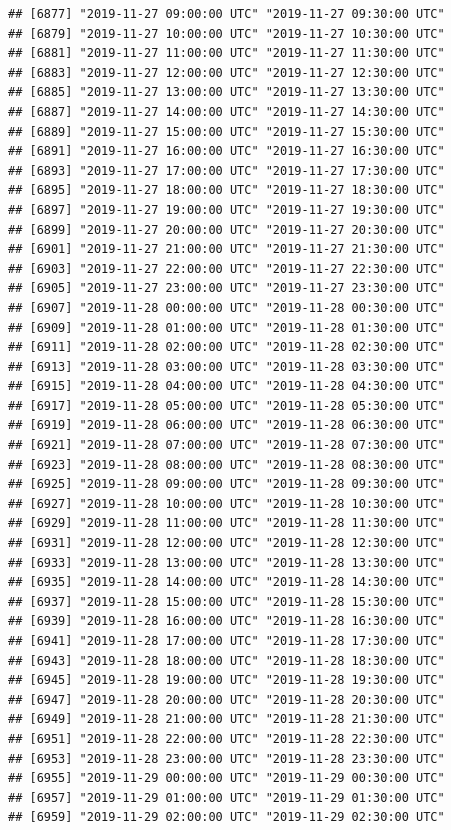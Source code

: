 \documentclass{article}\usepackage[]{graphicx}\usepackage[]{color}
\makeatletter
\newenvironment{kframe}{%
 \def\at@end@of@kframe{}%
 \ifinner\ifhmode%
  \def\at@end@of@kframe{\end{minipage}}%
  \begin{minipage}{\columnwidth}%
 \fi\fi%
 \def\FrameCommand##1{\hskip\@totalleftmargin \hskip-\fboxsep
 \colorbox{shadecolor}{##1}\hskip-\fboxsep
     \hskip-\linewidth \hskip-\@totalleftmargin \hskip\columnwidth}%
 \MakeFramed {\advance\hsize-\width
   \@totalleftmargin\z@ \linewidth\hsize
   \@setminipage}}%
 {\par\unskip\endMakeFramed%
 \at@end@of@kframe}
\newenvironment{knitrout}{}{} %
\makeatother
\begin{document}
\begin{knitrout}
\begin{kframe}
\begin{verbatim}
## [6877] "2019-11-27 09:00:00 UTC" "2019-11-27 09:30:00 UTC"
## [6879] "2019-11-27 10:00:00 UTC" "2019-11-27 10:30:00 UTC"
## [6881] "2019-11-27 11:00:00 UTC" "2019-11-27 11:30:00 UTC"
## [6883] "2019-11-27 12:00:00 UTC" "2019-11-27 12:30:00 UTC"
## [6885] "2019-11-27 13:00:00 UTC" "2019-11-27 13:30:00 UTC"
## [6887] "2019-11-27 14:00:00 UTC" "2019-11-27 14:30:00 UTC"
## [6889] "2019-11-27 15:00:00 UTC" "2019-11-27 15:30:00 UTC"
## [6891] "2019-11-27 16:00:00 UTC" "2019-11-27 16:30:00 UTC"
## [6893] "2019-11-27 17:00:00 UTC" "2019-11-27 17:30:00 UTC"
## [6895] "2019-11-27 18:00:00 UTC" "2019-11-27 18:30:00 UTC"
## [6897] "2019-11-27 19:00:00 UTC" "2019-11-27 19:30:00 UTC"
## [6899] "2019-11-27 20:00:00 UTC" "2019-11-27 20:30:00 UTC"
## [6901] "2019-11-27 21:00:00 UTC" "2019-11-27 21:30:00 UTC"
## [6903] "2019-11-27 22:00:00 UTC" "2019-11-27 22:30:00 UTC"
## [6905] "2019-11-27 23:00:00 UTC" "2019-11-27 23:30:00 UTC"
## [6907] "2019-11-28 00:00:00 UTC" "2019-11-28 00:30:00 UTC"
## [6909] "2019-11-28 01:00:00 UTC" "2019-11-28 01:30:00 UTC"
## [6911] "2019-11-28 02:00:00 UTC" "2019-11-28 02:30:00 UTC"
## [6913] "2019-11-28 03:00:00 UTC" "2019-11-28 03:30:00 UTC"
## [6915] "2019-11-28 04:00:00 UTC" "2019-11-28 04:30:00 UTC"
## [6917] "2019-11-28 05:00:00 UTC" "2019-11-28 05:30:00 UTC"
## [6919] "2019-11-28 06:00:00 UTC" "2019-11-28 06:30:00 UTC"
## [6921] "2019-11-28 07:00:00 UTC" "2019-11-28 07:30:00 UTC"
## [6923] "2019-11-28 08:00:00 UTC" "2019-11-28 08:30:00 UTC"
## [6925] "2019-11-28 09:00:00 UTC" "2019-11-28 09:30:00 UTC"
## [6927] "2019-11-28 10:00:00 UTC" "2019-11-28 10:30:00 UTC"
## [6929] "2019-11-28 11:00:00 UTC" "2019-11-28 11:30:00 UTC"
## [6931] "2019-11-28 12:00:00 UTC" "2019-11-28 12:30:00 UTC"
## [6933] "2019-11-28 13:00:00 UTC" "2019-11-28 13:30:00 UTC"
## [6935] "2019-11-28 14:00:00 UTC" "2019-11-28 14:30:00 UTC"
## [6937] "2019-11-28 15:00:00 UTC" "2019-11-28 15:30:00 UTC"
## [6939] "2019-11-28 16:00:00 UTC" "2019-11-28 16:30:00 UTC"
## [6941] "2019-11-28 17:00:00 UTC" "2019-11-28 17:30:00 UTC"
## [6943] "2019-11-28 18:00:00 UTC" "2019-11-28 18:30:00 UTC"
## [6945] "2019-11-28 19:00:00 UTC" "2019-11-28 19:30:00 UTC"
## [6947] "2019-11-28 20:00:00 UTC" "2019-11-28 20:30:00 UTC"
## [6949] "2019-11-28 21:00:00 UTC" "2019-11-28 21:30:00 UTC"
## [6951] "2019-11-28 22:00:00 UTC" "2019-11-28 22:30:00 UTC"
## [6953] "2019-11-28 23:00:00 UTC" "2019-11-28 23:30:00 UTC"
## [6955] "2019-11-29 00:00:00 UTC" "2019-11-29 00:30:00 UTC"
## [6957] "2019-11-29 01:00:00 UTC" "2019-11-29 01:30:00 UTC"
## [6959] "2019-11-29 02:00:00 UTC" "2019-11-29 02:30:00 UTC"

\end{verbatim}
\end{kframe}
\end{knitrout}
\end{document}
